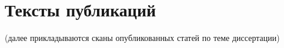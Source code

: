 \chapter*{Тексты публикаций}

\begin{center}
    (далее прикладываются сканы опубликованных статей по теме диссертации)
\end{center}

